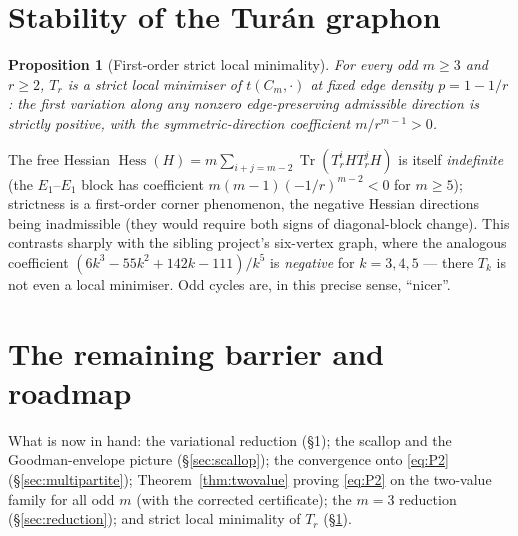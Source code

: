 \documentclass[11pt]{article}
\newtheorem{proposition}[theorem]{Proposition}
\theoremstyle{remark}
\newcommand{\Tr}{\operatorname{Tr}}
\begin{document}
\section{Stability of the Tur\'an graphon}

\begin{proposition}[First-order strict local minimality]\label{prop:stability}
For every odd $m\ge3$ and $r\ge2$, $T_r$ is a strict local minimiser of $t(C_m,\cdot)$ at fixed edge density $p=1-1/r$: the first variation along any nonzero edge-preserving admissible direction is strictly positive, with the symmetric-direction coefficient $m/r^{m-1}>0$.
\end{proposition}

The free Hessian $\operatorname{Hess}(H)=m\sum_{i+j=m-2}\Tr(T_r^iHT_r^jH)$ is itself \emph{indefinite} (the $E_1$--$E_1$ block has coefficient $m(m-1)(-1/r)^{m-2}<0$ for $m\ge5$); strictness is a first-order corner phenomenon, the negative Hessian directions being inadmissible (they would require both signs of diagonal-block change).  This contrasts sharply with the sibling project's six-vertex graph, where the analogous coefficient $(6k^3-55k^2+142k-111)/k^5$ is \emph{negative} for $k=3,4,5$ --- there $T_k$ is not even a local minimiser.  Odd cycles are, in this precise sense, ``nicer''.

\section{The remaining barrier and roadmap}\label{sec:barrier}

What is now in hand: the variational reduction (\S1); the scallop and the Goodman-envelope picture (\S\ref{sec:scallop}); the convergence onto \eqref{eq:P2} (\S\ref{sec:multipartite}); Theorem~\ref{thm:twovalue} proving \eqref{eq:P2} on the two-value family for all odd $m$ (with the corrected certificate); the $m=3$ reduction (\S\ref{sec:reduction}); and strict local minimality of $T_r$ (\S\ref{prop:stability}).
\end{document}
